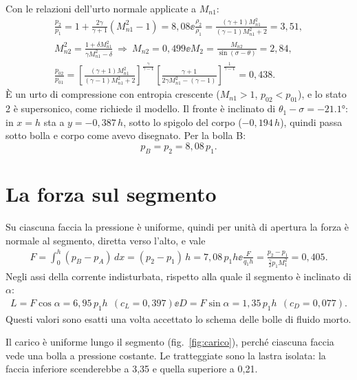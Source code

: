 Con le relazioni dell'urto normale applicate a $M_{n1}$:
\begin{gather*}
\frac{p_2}{p_1}=1+\frac{2\gamma}{\gamma+1}\left(M_{n1}^2-1\right)=8{,}08 \ee
\frac{\rho_2}{\rho_1}=\frac{(\gamma+1)M_{n1}^2}{(\gamma-1)M_{n1}^2+2}=3{,}51,\\
M_{n2}^2=\frac{1+\delta M_{n1}^2}{\gamma M_{n1}^2-\delta}\ \Rightarrow\ M_{n2}=0{,}499 \ee
M_2=\frac{M_{n2}}{\sin(\sigma-\theta)}=2{,}84,\\
\frac{p_{02}}{p_{01}}=\left[\frac{(\gamma+1)M_{n1}^2}{(\gamma-1)M_{n1}^2+2}\right]^{\frac{\gamma}{\gamma-1}}
\left[\frac{\gamma+1}{2\gamma M_{n1}^2-(\gamma-1)}\right]^{\frac{1}{\gamma-1}}=0{,}438 .
\end{gather*}
È un urto di compressione con entropia crescente ($M_{n1}>1$, $p_{02}<p_{01}$), e lo stato 2 è supersonico, come
richiede il modello. Il fronte è inclinato di $\theta_1-\sigma=\ang{-21.1}$: in $x=h$ sta a $y=-0{,}387\,h$, sotto
lo spigolo del corpo ($-0{,}194\,h$), quindi passa sotto bolla e corpo come avevo disegnato. Per la bolla B:
\[
p_B=p_2=8{,}08\,p_1 .
\]

\section*{La forza sul segmento}
Su ciascuna faccia la pressione è uniforme, quindi per unità di apertura la forza è normale al segmento, diretta verso
l'alto, e vale
\begin{gather*}
F=\int_0^h(p_B-p_A)\,dx=(p_2-p_1)\,h=7{,}08\,p_1h \ee
\frac{F}{q_1h}=\frac{p_2-p_1}{\tfrac{\gamma}{2}p_1M_1^2}=0{,}405 .
\end{gather*}
Negli assi della corrente indisturbata, rispetto alla quale il segmento è inclinato di $\alpha$:
\begin{gather*}
L=F\cos\alpha=6{,}95\,p_1h\ \ (c_L=0{,}397) \ee D=F\sin\alpha=1{,}35\,p_1h\ \ (c_D=0{,}077).
\end{gather*}
Questi valori sono esatti una volta accettato lo schema delle bolle di fluido morto.


Il carico è uniforme lungo il segmento (fig.~\ref{fig:carico}), perché ciascuna faccia vede una bolla a pressione
costante. Le tratteggiate sono la lastra isolata: la faccia inferiore scenderebbe a 3,35 e quella superiore a 0,21.

